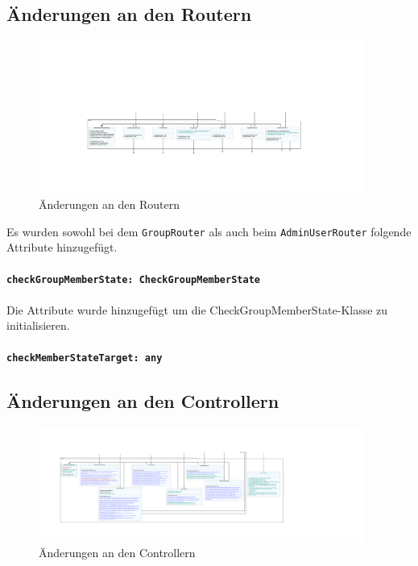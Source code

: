 \documentclass{implementierungsheft}
\begin{document}
\subsection{Änderungen an den Routern}
\begin{figure}[htp]
    \centering
    \includegraphics[width=0.95\textwidth]{images/uml/routers.pdf}
    \caption{Änderungen an den Routern}
    \label{fig:routers}
\end{figure}

Es wurden sowohl bei dem \texttt{GroupRouter} als auch beim \texttt{AdminUserRouter} folgende Attribute hinzugefügt.

\paragraph{\texttt{checkGroupMemberState: CheckGroupMemberState}} Die Attribute wurde hinzugefügt um die CheckGroupMemberState-Klasse zu initialisieren.
\paragraph{\texttt{checkMemberStateTarget: any}}

\newpage

\subsection{Änderungen an den Controllern}

\begin{figure}[htp]
    \centering
    \includegraphics[width=0.95\textwidth]{images/uml/controller.pdf}
    \caption{Änderungen an den Controllern}
    \label{fig:controller}
\end{figure}
\end{document}
